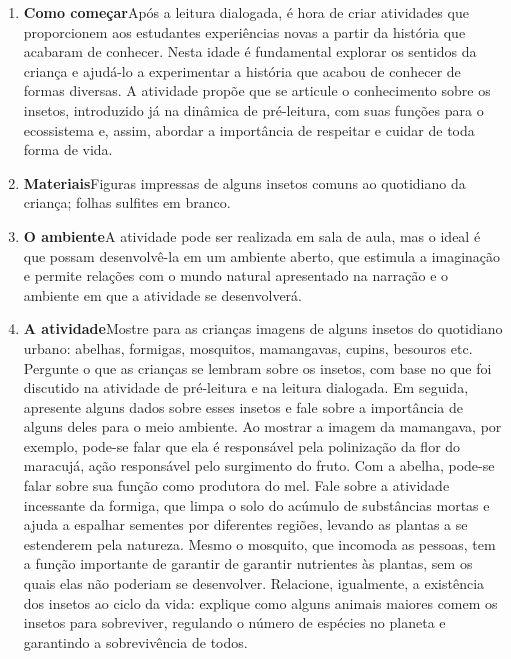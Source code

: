 \documentclass[11pt]{extarticle}
\begin{document}
\begin{enumerate}
\item \textbf{Como começar}\quad Após a leitura dialogada, é hora de criar 
atividades que proporcionem aos estudantes experiências novas a partir da história 
que acabaram de conhecer. Nesta idade é fundamental explorar os sentidos da criança e 
ajudá-lo a experimentar a história que acabou de conhecer de formas diversas. 
A atividade propõe que se articule o conhecimento sobre os insetos, introduzido já na dinâmica de pré-leitura, com suas funções para o ecossistema e, assim, abordar a importância de respeitar e cuidar de toda forma de vida. 

\item \textbf{Materiais}\quad Figuras impressas de alguns insetos comuns ao quotidiano da criança; folhas sulfites em branco. 

\item \textbf{O ambiente}\quad A atividade pode ser realizada em sala de aula, mas o ideal é que possam desenvolvê-la em um ambiente aberto, que estimula a imaginação e permite relações com o mundo natural apresentado na narração e o ambiente em que a atividade se desenvolverá.

\item \textbf{A atividade}\quad Mostre para as crianças imagens de alguns insetos do quotidiano urbano: abelhas, formigas, mosquitos, mamangavas, cupins, besouros etc.
Pergunte o que as crianças se lembram sobre os insetos, com base no que foi discutido na atividade de pré-leitura e na leitura dialogada. Em seguida, apresente alguns dados sobre esses insetos e fale sobre a importância de alguns deles para o meio ambiente. Ao mostrar a imagem da mamangava, por exemplo, pode-se falar que ela é responsável pela polinização da flor do maracujá, ação responsável pelo surgimento do fruto. Com a abelha, pode-se falar sobre sua função como produtora do mel. Fale sobre a atividade incessante da formiga, que limpa o solo do acúmulo de substâncias mortas e ajuda a espalhar sementes por diferentes regiões, levando as plantas a se estenderem pela natureza. Mesmo o mosquito, que incomoda as pessoas, tem a função importante de garantir de garantir nutrientes às plantas, sem os quais elas não poderiam se desenvolver. Relacione, igualmente, a existência dos insetos ao ciclo da vida: explique como alguns animais maiores comem os insetos para sobreviver, regulando o número de espécies no planeta e garantindo a sobrevivência de todos.


\end{enumerate}
\end{document}
